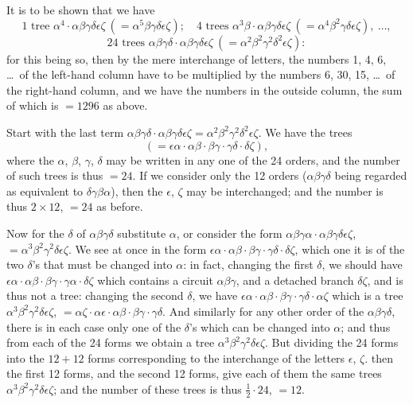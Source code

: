 \documentclass[11pt,a4paper]{article}
\begin{document}
It is to be shown that we have
\[
1\text{ tree } \alpha^4 \cdot \alpha\beta\gamma\delta\epsilon\zeta\ (= \alpha^5\beta\gamma\delta\epsilon\zeta);\quad 4\text{ trees } \alpha^3\beta \cdot \alpha\beta\gamma\delta\epsilon\zeta\ (= \alpha^4\beta^2\gamma\delta\epsilon\zeta),\ \ldots,
\]
\[
24\text{ trees } \alpha\beta\gamma\delta \cdot \alpha\beta\gamma\delta\epsilon\zeta\ (= \alpha^2\beta^2\gamma^2\delta^2\epsilon\zeta):
\]
for this being so, then by the mere interchange of letters, the numbers 1, 4, 6, \ldots\ of the left-hand column have to be multiplied by the numbers 6, 30, 15, \ldots\ of the right-hand column, and we have the numbers in the outside column, the sum of which is $= 1296$ as above.

Start with the last term $\alpha\beta\gamma\delta \cdot \alpha\beta\gamma\delta\epsilon\zeta = \alpha^2\beta^2\gamma^2\delta^2\epsilon\zeta$. We have the trees
\[
(= \epsilon\alpha \cdot \alpha\beta \cdot \beta\gamma \cdot \gamma\delta \cdot \delta\zeta),
\]
where the $\alpha$, $\beta$, $\gamma$, $\delta$ may be written in any one of the 24 orders, and the number of such trees is thus $= 24$. If we consider only the 12 orders ($\alpha\beta\gamma\delta$ being regarded as equivalent to $\delta\gamma\beta\alpha$), then the $\epsilon$, $\zeta$ may be interchanged; and the number is thus $2 \times 12$, $=24$ as before.

Now for the $\delta$ of $\alpha\beta\gamma\delta$ substitute $\alpha$, or consider the form $\alpha\beta\gamma\alpha \cdot \alpha\beta\gamma\delta\epsilon\zeta$, $= \alpha^3\beta^2\gamma^2\delta\epsilon\zeta$. We see at once in the form $\epsilon\alpha \cdot \alpha\beta \cdot \beta\gamma \cdot \gamma\delta \cdot \delta\zeta$, which one it is of the two $\delta$'s that must be changed into $\alpha$: in fact, changing the first $\delta$, we should have $\epsilon\alpha \cdot \alpha\beta \cdot \beta\gamma \cdot \gamma\alpha \cdot \delta\zeta$ which contains a circuit $\alpha\beta\gamma$, and a detached branch $\delta\zeta$, and is thus not a tree: changing the second $\delta$, we have $\epsilon\alpha \cdot \alpha\beta \cdot \beta\gamma \cdot \gamma\delta \cdot \alpha\zeta$ which is a tree $\alpha^3\beta^2\gamma^2\delta\epsilon\zeta$, $= \alpha\zeta \cdot \alpha\epsilon \cdot \alpha\beta \cdot \beta\gamma \cdot \gamma\delta$. And similarly for any other order of the $\alpha\beta\gamma\delta$, there is in each case only one of the $\delta$'s which can be changed into $\alpha$; and thus from each of the 24 forms we obtain a tree $\alpha^3\beta^2\gamma^2\delta\epsilon\zeta$. But dividing the 24 forms into the $12+12$ forms corresponding to the interchange of the letters $\epsilon$, $\zeta$. then the first 12 forms, and the second 12 forms, give each of them the same trees $\alpha^3\beta^2\gamma^2\delta\epsilon\zeta$; and the number of these trees is thus $\tfrac{1}{2} \cdot 24$, $=12$.
\end{document}
